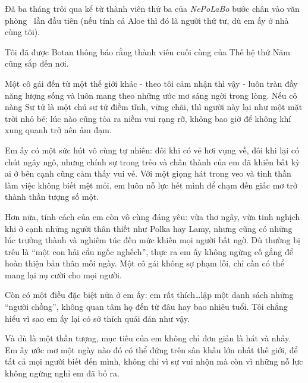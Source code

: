 \documentclass[../main.tex]{subfiles}
\begin{document}


Đã ba tháng trôi qua kể từ thành viên thứ ba của \textit{NePoLaBo} bước chân vào văn phòng \hll\ lần đầu tiên (nếu tính cả Aloe thì đó là người thứ tư, dù em ấy ở nhà cùng tôi).

Tôi đã được Botan thông báo rằng thành viên cuối cùng của Thế hệ thứ Năm cũng sắp đến nơi.

Một cô gái đến từ một thế giới khác - theo tôi cảm nhận thì vậy - luôn tràn đầy năng lượng sống và luôn mang theo những ước mơ sáng ngời trong lòng. Nếu cô nàng Sư tử là một chú sư tử điềm tĩnh, vững chãi, thì người này lại như một mặt trời nhỏ bé: lúc nào cũng tỏa ra niềm vui rạng rỡ, không bao giờ để không khí xung quanh trở nên ảm đạm.

Em ấy có một sức hút vô cùng tự nhiên: đôi khi có vẻ hơi vụng về, đôi khi lại có chút ngây ngô, nhưng chính sự trong trẻo và chân thành của em đã khiến bất kỳ ai ở bên cạnh cũng cảm thấy vui vẻ. Với một giọng hát trong veo và tinh thần làm việc không biết mệt mỏi, em luôn nỗ lực hết mình để chạm đến giấc mơ trở thành thần tượng số một.

Hơn nữa, tính cách của em còn vô cùng đáng yêu: vừa thơ ngây, vừa tinh nghịch khi ở cạnh những người thân thiết như Polka hay Lamy, nhưng cũng có những lúc trưởng thành và nghiêm túc đến mức khiến mọi người bất ngờ. Dù thường bị trêu là ``một con hải cẩu ngốc nghếch'', thực ra em ấy không ngừng cố gắng để hoàn thiện bản thân mỗi ngày. Một cô gái không sợ phạm lỗi, chỉ cần có thể mang lại nụ cười cho mọi người.

Còn có một điều đặc biệt nữa ở em ấy: em rất thích\dots lập một danh sách những ``người chồng'', không quan tâm họ đến từ đâu hay bao nhiêu tuổi. Tôi chẳng hiểu vì sao em ấy lại có sở thích quái đản như vậy.

Và dù là một thần tượng, mục tiêu của em không chỉ đơn giản là hát và nhảy. Em ấy ước mơ một ngày nào đó có thể đứng trên sân khấu lớn nhất thế giới, để tất cả mọi người biết đến mình, không chỉ vì sự vui nhộn mà còn vì những nỗ lực không ngừng nghỉ em đã bỏ ra.
\end{document}
